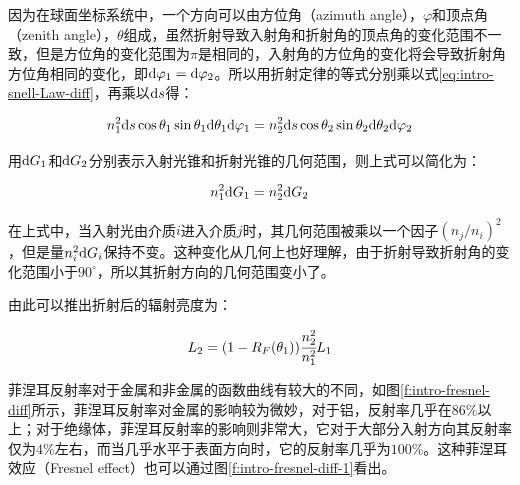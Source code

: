\noindent 因为在球面坐标系统中，一个方向可以由方位角（azimuth angle），$\varphi$和顶点角（zenith angle），$\theta$组成，虽然折射导致入射角和折射角的顶点角的变化范围不一致，但是方位角的变化范围为$\pi$是相同的，入射角的方位角的变化将会导致折射角方位角相同的变化，即${\rm d}\varphi_1={\rm d}\varphi_2$。所以用折射定律的等式分别乘以式\ref{eq:intro-snell-Law-diff}，再乘以${\rm d}s$得：

\begin{equation}
	n^{2}_1{\rm d}s\cos\theta_1 \sin\theta_1 {\rm d}\theta_1 {\rm d}\varphi_1=n^{2}_2 {\rm d}s \cos\theta_2 \sin\theta_2 {\rm d}\theta_2 {\rm d}\varphi_2
\end{equation}

\noindent 用${\rm d}G_1$和${\rm d}G_2$分别表示入射光锥和折射光锥的几何范围，则上式可以简化为：

\begin{equation}\label{eq:eq-intro-eq:intro-snell-Law-1}
	n^{2}_1 {\rm d}G_1=n^{2}_2 {\rm d}G_2
\end{equation}

在上式中，当入射光由介质$i$进入介质$j$时，其几何范围被乘以一个因子$(n_j/n_i)^2$，但是量$n^2_i{\rm d}G_i$保持不变。这种变化从几何上也好理解，由于折射导致折射角的变化范围小于$90^{\circ}$，所以其折射方向的几何范围变小了。

由此可以推出折射后的辐射亮度为：

\begin{equation}\label{eq:intro-fresnel-refractiom}
	L_2=(1-R_F(\theta_1)) \cfrac{n^2_2}{n^2_1}L_1
\end{equation}

\noindent 菲涅耳反射率对于金属和非金属的函数曲线有较大的不同，如图\ref{f:intro-fresnel-diff}所示，菲涅耳反射率对金属的影响较为微妙，对于铝，反射率几乎在$86\%$以上；对于绝缘体，菲涅耳反射率的影响则非常大，它对于大部分入射方向其反射率仅为$4\%$左右，而当几乎水平于表面方向时，它的反射率几乎为$100\%$。这种菲涅耳效应（Fresnel effect）也可以通过图\ref{f:intro-fresnel-diff-1}看出。

